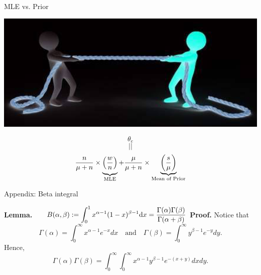 \begin{frame}[fragile]
\begin{center}
  MLE vs. Prior

 \includegraphics[scale=0.25]{./Codes/tug_war.png}
\end{center}
\[\theta_e\]
\[||\]
\begin{align*}
 \frac{n}{\mu+n}\times \underbrace{\mystrut{1em}\left(\frac{w}{n}\right)}_{\text{MLE}} + \frac{\mu}{\mu+n} \times \underbrace{\left(\frac{s}{\mu}\right)}_{\text{Mean of Prior}}
 \end{align*}
\end{frame}
\begin{frame}{Appendix: Beta integral}

	 {\bf Lemma.~} $\quad \displaystyle B(\alpha,\beta): = \int_0^1 x^{\alpha-1}(1-x)^{\beta-1}\mathrm{d} x = \frac{\Gamma(\alpha)\Gamma(\beta)}{\Gamma(\alpha+\beta)}$
	 \vfill
	 {\bf Proof.}
 Notice that
 \[
 \Gamma(\alpha) = \int_0^\infty x^{\alpha-1}e^{-x}dx
 \quad\text{and}\quad
 \Gamma(\beta) = \int_0^\infty y^{\beta-1}e^{-y}dy.
 \]
 Hence,
 \[
 \Gamma(\alpha)\Gamma(\beta)
 = \int_0^\infty\int_0^\infty x^{\alpha-1}y^{\beta-1}e^{-(x+y)}dxdy.
 \]
 \end{frame}

